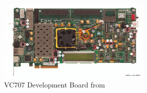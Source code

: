 %
%
%
%
%



\begin{figure}[htbp]
    \centering
    \includegraphics[width=0.65\textwidth]{./figures/vc707}
    \caption{ VC707 Development Board from \cite{xilinx:vc707}
    \label{fig:vc707}}
\end{figure}


